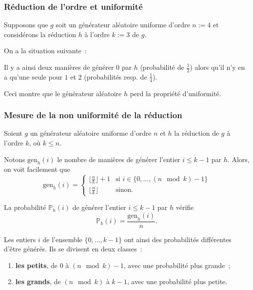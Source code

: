 \begin{frame}[fragile]
\frametitle{Réduction de l'ordre et uniformité}
Supposons que $g$ soit un générateur aléatoire uniforme d'ordre $n := 4$
et considérons la réduction $h$ à l'ordre $k := 3$ de $g$.
\medskip

On a la situation suivante~:
\begin{center}
\end{center}
Il y a ainsi deux manières de générer $0$ par $h$ (probabilité de $\frac{1}{2}$)
alors qu'il n'y en a qu'une seule pour $1$ et $2$ (probabilités resp.
de $\frac{1}{4}$).
\bigskip

Ceci montre que le générateur aléatoire $h$ \alert{perd la propriété d'uniformité}.
\end{frame}

\begin{frame}[fragile]
\frametitle{Mesure de la non uniformité de la réduction}
Soient $g$ un générateur aléatoire uniforme d'ordre $n$ et $h$ la
réduction de $g$ à l'ordre $k$, où $k \leq n$.
\medskip

Notons $\mathrm{gen}_h(i)$ le nombre de manières de générer l'entier
$i \leq k - 1$ par $h$. Alors, on voit facilement que
\begin{equation*}
    \mathrm{gen}_h(i) =
    \begin{cases}
        \lfloor \frac{n}{k} \rfloor + 1 &
            \mbox{si } i \in \{0, \dots, (n \mod k) -1\} \\
        \lfloor \frac{n}{k} \rfloor &
            \mbox{sinon}.
    \end{cases}
\end{equation*}

La probabilité $\mathbb{P}_h(i)$ de générer l'entier $i \leq k - 1$ par
$h$ vérifie
\begin{equation*}
    \mathbb{P}_h(i) = \frac{\mathrm{gen}_h(i)}{n}.
\end{equation*}

Les entiers $i$ de l'ensemble $\{0, \dots, k - 1\}$ ont ainsi des
probabilités différentes d'être générés. Ils se divisent en deux classes~:
\begin{enumerate}
    \item {\bf les petits}, de $0$ à $(n \mod k) - 1$, avec une probabilité
    plus grande~;
    \item {\bf les grands}, de $(n \mod k)$ à $k - 1$, avec une probabilité
    plus petite.
\end{enumerate}
\end{frame}

